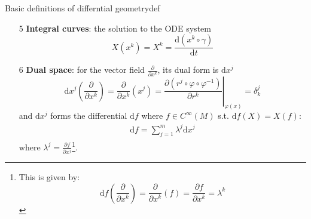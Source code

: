 \begin{definition}{Basic definitions of differntial geometry}{def}
\begin{enumerate}
        $$
        \frac{\partial}{\partial x^k}(f)_x = \left.\frac{\partial (f\circ \varphi^{-1})}{\partial r^k}\right\vert_{\varphi(x)},\ k=1,\cdots,m
        $$
        and these tangent vectors $\left\{\frac{\partial}{\partial x^k}\right\}_{k=1}^m$ froms the basis for $\mathrm{T}_x(M)$, that is 
        $$
        X = \sum^m_{k=1}X^k\frac{\partial}{\partial x^k},\ \forall X\in\mathrm{T}_x(M)
        $$
        where $X^k = X(x^k)$\footnote{This is given by:
        \begin{align*}
            \frac{\partial}{\partial x^k}(x^j) = \left.\frac{\partial (x^j \circ \varphi^{-1})}{\partial r^k}\right\vert_{\varphi(x)} = \left.\frac{\partial (r^j\circ \varphi \circ \varphi^{-1})}{\partial r^k}\right\vert_{\varphi(x)} = \left.\frac{\partial r^j}{\partial r^k}\right\vert_{\varphi(x)} = \delta ^j_k \Rightarrow X(x^j)=\sum^m_{k=1}X^k\delta^j_k=X^j
        \end{align*}}.
        \item[5] \textbf{Integral curves}: the solution to the ODE system
        $$
        X(x^k) = X^k  = \frac{\mathrm{d}(x^k\circ\gamma)}{\mathrm{d}t}
        $$
        \item[6] \textbf{Dual space}: for the vector field $\frac{\partial}{\partial x^k}$, its dual form is $\mathrm{d}x^j$
        $$
        \mathrm{d}x^j\left(\frac{\partial}{\partial x^k}\right) = \frac{\partial}{\partial x^k}(x^j) = \left.\frac{\partial (r^j \circ \varphi \circ \varphi^{-1})}{\partial r^k}\right\vert_{\varphi(x)} = \delta^j_k
        $$
        and $\mathrm{d}x^j$ forms the differential $\mathrm{d}f$ where $f\in C^{\infty}(M)$ s.t. $\mathrm{d}f(X)=X(f)$:
        \begin{align*}
            \mathrm{d}f = \sum^m_{j=1}\lambda^j\mathrm{d}x^j
        \end{align*}
        where $\lambda^j = \frac{\partial f}{\partial x^j}$\footnote{This is given by: 
        $$
        \mathrm{d}f\left(\frac{\partial}{\partial x^k}\right) = \frac{\partial}{\partial x^k}(f) = \frac{\partial f}{\partial x^k} = \lambda^k
        $$
        }.
    \end{enumerate}
\end{definition}

